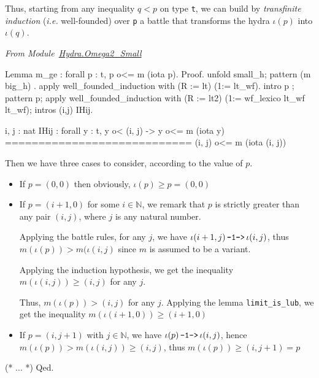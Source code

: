 
Thus, starting from any inequality $q < p$ on type \texttt{t}, we can build 
by \emph{transfinite induction} (\emph{i.e.} well-founded) over \texttt{p} a battle 
that transforms the hydra $\iota(p)$ into $\iota(q)$.

\vspace{4pt}
\emph{From Module~\href{../theories/html/hydras.Hydra.Omega2_Small.html\#m_ge}{Hydra.Omega2\_Small}}

\begin{Coqsrc}
  Lemma m_ge : forall p : t,   p o<= m (iota p).
  Proof.
    unfold small_h; pattern (m big_h) .   
     apply  well_founded_induction with (R := lt) (1:= lt_wf).
     intro p ; pattern p;
     apply  well_founded_induction with 
               (R := lt2) (1:= wf_lexico lt_wf lt_wf);
     intros (i,j) IHij. 
\end{Coqsrc}

\begin{Coqanswer}
  i, j : nat
  IHij : forall y : t, y o< (i, j) -> y o<= m (iota y)
  ============================
  (i, j) o<= m (iota (i, j)) 
\end{Coqanswer}


Then we have  three cases to consider, according to the value of $p$.
\begin{itemize}
\item If $p=(0,0)$ then obviously, $\iota(p)\geq p = (0,0)$
\item If  $p=(i+1,0)$ for some $i\in\mathbb{N}$, we
 remark  that $p$ is strictly greater than any pair $ (i, j)$, where $j$ 
is any natural number.

Applying the battle rules, for any $j$, we have $\iota(i+1,j)  {\mbox{\,\texttt{-1->}\,}} \iota(i, j) $, thus $m(\iota(p)) > m(\iota(i,j)$ since  $m$ is assumed to be a variant.

Applying the induction hypothesis, we get the inequality
 $ m(\iota(i,j)) \geq (i,j)$ for any $j$. 

Thus, $m(\iota(p)) > (i,j)$ for any $j$.
Applying the lemma \texttt{limit\_is\_lub}, we get  the inequality
$m(\iota(i+1,0))\geq (i+1,0)$

\item If $p=(i,j+1)$ with $j\in\mathbb{N}$, we have  $\iota(p)  {\mbox{\,\texttt{-1->}\,}} \iota(i, j) $,
hence $m(\iota(p))> m(\iota(i,j)) \geq (i,j)$, thus $m(\iota(p))\geq (i,j+1)=p$

\end{itemize}

\begin{Coqsrc}
  (* ... *)
Qed.
\end{Coqsrc}

